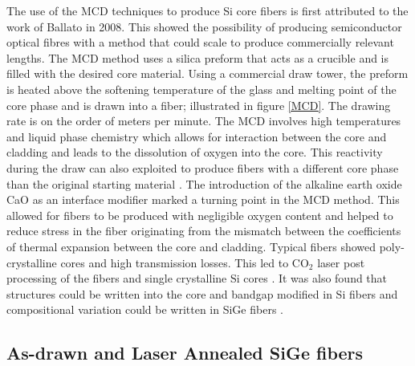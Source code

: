 The use of the MCD techniques to produce Si core fibers is first attributed to the work of Ballato \cite{Ballato2008SiliconFiber} in 2008. This showed the possibility of producing semiconductor optical fibres with a method that could scale to produce commercially relevant lengths. The MCD method uses a silica preform that acts as a crucible and is filled with the desired core material. Using a commercial draw tower, the preform is heated above the softening temperature of the glass and melting point of the core phase and is drawn into a fiber; illustrated in figure \ref{MCD}. The drawing rate is on the order of meters per minute. The MCD involves high temperatures and liquid phase chemistry which allows for interaction between the core and cladding and leads to the dissolution of oxygen into the core. This reactivity during the draw can also exploited to produce fibers with a different core phase than the original starting material \cite{almuminium core}. The introduction of the alkaline earth oxide CaO as an interface modifier  \cite{Nordstrand2013AlkalineProduction} marked a turning point in the MCD method. This allowed for fibers to be produced with negligible oxygen content and helped to reduce stress in the fiber originating from the mismatch between the coefficients of thermal expansion between the core and cladding. Typical fibers showed poly-crystalline cores and high transmission losses. This led to $\text{CO}_2$ laser post processing of the fibers and single crystalline Si cores \cite{Healy2016Loss}. It was also found that structures could be written into the core and bandgap modified in Si fibers \cite{Fokine2017LaserFibers, Healy2014ExtremeFibres} and compositional variation could be written in SiGe fibers \cite{Coucheron2016}.



\subsection{As-drawn and Laser Annealed SiGe fibers}

